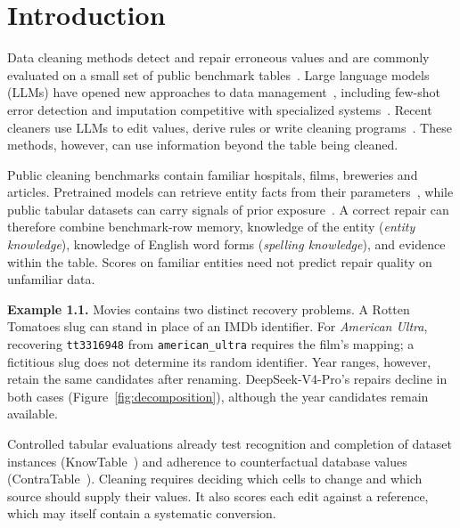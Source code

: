 \documentclass[sigconf, nonacm]{acmart}
\begin{document}
\makeatletter
\let\core@savedtextbottom\@textbottom
\flushbottom
\AddToHookNext{shipout/after}{\global\let\@textbottom\core@savedtextbottom}
\makeatother
\maketitle

\vldbtopmatter


\section{Introduction}\label{sec:intro}
Data cleaning methods detect and repair erroneous values and are commonly evaluated on a small
set of public benchmark tables~\cite{rahm2000data,ilyas2019book,chu2016overview,abedjan2016detecting}.
Large language models (LLMs) have opened new approaches to data management~\cite{fernandez2023disrupt},
including few-shot error detection and imputation competitive with specialized
systems~\cite{narayan2022wrangle}. Recent cleaners use LLMs to edit values, derive rules or write
cleaning programs~\cite{ni2025zeroed,ni2024iterclean,zhang2025data,tabclean2026}. These methods,
however, can use information beyond the table being cleaned.

Public cleaning benchmarks contain familiar hospitals, films, breweries and articles.
Pretrained models can retrieve entity facts from their parameters~\cite{petroni2019lama,mallen2023trust},
while public tabular datasets can carry signals of prior exposure~\cite{bordt2024elephants,silvestri2025knowtable}.
A correct repair can therefore combine benchmark-row memory, knowledge of the entity
(\emph{entity knowledge}), knowledge of English word forms (\emph{spelling knowledge}), and
evidence within the table. Scores on familiar entities need not predict repair quality
on unfamiliar data.

\smallskip\noindent\textbf{Example 1.1.} Movies contains two distinct recovery problems.
A Rotten Tomatoes slug can stand in place of an IMDb identifier. For \emph{American Ultra},
recovering \texttt{tt3316948} from \texttt{american\_ultra} requires the film's mapping;
a fictitious slug does not determine its random identifier. Year ranges, however, retain the
same candidates after renaming. DeepSeek-V4-Pro's repairs decline in both cases
(Figure~\ref{fig:decomposition}), although the year candidates remain available.
\smallskip

Controlled tabular evaluations already test recognition and completion of dataset instances
(KnowTable~\cite{silvestri2025knowtable}) and adherence to counterfactual database values
(ContraTable~\cite{wang2026contratable}). Cleaning requires deciding which cells to change
and which source should supply their values. It also scores each edit against a reference,
which may itself contain a systematic conversion.
\end{document}
